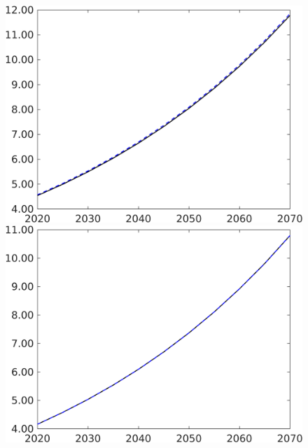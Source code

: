 \begin{figure}[h!!]
\begin{minipage}[]{0.32\textwidth}
	\end{minipage}
	\begin{minipage}[]{0.32\textwidth}
		\includegraphics[width=1\textwidth]{../../codding_model/own_basedOnFried/optimalPol_190722_tidiedUp/figures/all_10Aout22/CountTaul_modxgr_target_wlg_spillover0_sep1_extern0_PV1_etaa0.79_lgd0.png}
	\end{minipage}
	\begin{minipage}[]{0.32\textwidth}
		\includegraphics[width=1\textwidth]{../../codding_model/own_basedOnFried/optimalPol_190722_tidiedUp/figures/all_10Aout22/CountTaul_modxgr_target_wlf_spillover0_sep1_extern0_PV1_etaa0.79_lgd0.png}

\end{minipage}
\end{figure}
